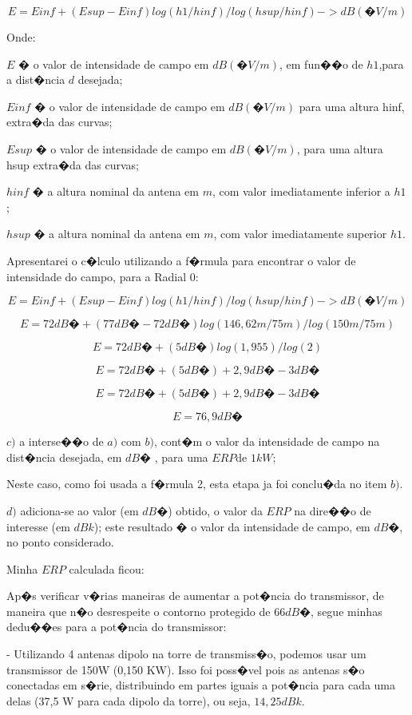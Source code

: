 $$E = Einf + ( Esup - Einf )log( h1 / hinf )/log( hsup / hinf )-> dB(�V / m)$$

Onde:

$E$ � o valor de intensidade de campo em $dB (�V/m)$, em fun��o de $h1$,para a dist�ncia $d$ desejada; 

$Einf$ � o valor de intensidade de campo em $dB (�V/m)$ para uma altura hinf, extra�da das curvas; 

$Esup$ � o valor de intensidade de campo em $dB (�V/m)$, para uma altura hsup extra�da das curvas; 

$hinf$ � a altura nominal da antena em $m$, com valor imediatamente inferior a $h1$; 

$hsup$ � a altura nominal da antena em $m$, com valor imediatamente superior $h1$. 

Apresentarei o c�lculo utilizando a f�rmula para encontrar o valor de intensidade do campo, para a Radial 0:

 $$E = Einf + ( Esup - Einf )log( h1 / hinf )/log( hsup / hinf )-> dB(�V / m)$$ 

 $$E =  72dB� + ( 77dB� - 72dB� )log( 146,62m / 75m )/log( 150m / 75m )$$ 

 $$E =  72dB� + ( 5dB� )log( 1,955 )/log( 2 )$$ 

 $$E =  72dB� + ( 5dB� ) + 2,9dB� - 3dB� $$ 

 $$E =  72dB� + ( 5dB� ) + 2,9dB� - 3dB� $$ 

 $$E =  76,9dB� $$ 


$c)$ a interse��o de $a)$ com $b)$, cont�m o valor da intensidade de campo na dist�ncia desejada, em $dB�$
, para  uma $ERP$de $1 kW$;

Neste caso, como foi usada a f�rmula 2, esta etapa ja foi conclu�da no item $b)$.

$d)$ adiciona-se ao valor (em $dB�$) obtido, o valor da $ERP$ na dire��o de interesse (em $dBk$); 
este resultado � o valor da intensidade de campo, em $dB�$, no ponto considerado. 

Minha $ERP$ calculada ficou:

Ap�s verificar v�rias maneiras de aumentar a pot�ncia do transmissor, de maneira que n�o desrespeite o contorno protegido de $66dB�$, segue minhas dedu��es para a pot�ncia do transmissor:

 - Utilizando 4 antenas dipolo na torre de transmiss�o, podemos usar um transmissor de 150W (0,150 KW). Isso foi poss�vel pois as antenas s�o conectadas em s�rie, distribuindo em partes iguais
a pot�ncia para cada uma delas (37,5 W para cada dipolo da torre), ou seja, $14,25dBk$.

